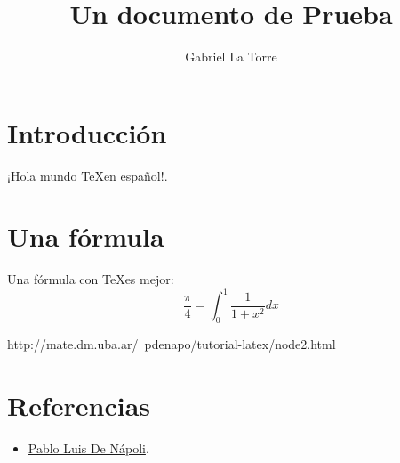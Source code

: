 \documentclass[spanish] {article}
\begin{document}
\title{Un documento de Prueba}
\author{Gabriel La Torre}
\maketitle
\section{Introducción}
¡Hola mundo \TeX en español!.
\section{Una fórmula}
Una fórmula con \TeX es mejor:
$$ \frac{\pi}{4} = \int_0^1 \frac{1}{1+x^2} dx $$


http://mate.dm.uba.ar/~pdenapo/tutorial-latex/node2.html

\section{Referencias}

\begin{itemize}
  \item \href{http://mate.dm.uba.ar/~pdenapo/tutorial-latex/node2.html}{Pablo Luis De Nápoli}.
\end{itemize}
\end{document}
